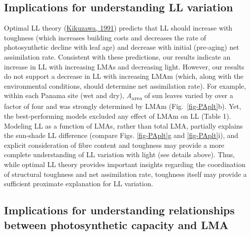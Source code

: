\documentclass[
  12pt,
  a4paper,
,tablecaptionabove
]{scrartcl}
\begin{document}
\hypertarget{implications-for-understanding-ll-variation}{%
\subsection{Implications for understanding LL
variation}\label{implications-for-understanding-ll-variation}}

Optimal LL theory (\protect\hyperlink{ref-Kikuzawa1991}{Kikuzawa, 1991})
predicts that LL should increase with toughness (which increases
building costs and decreases the rate of photosynthetic decline with
leaf age) and decrease with initial (pre-aging) net assimilation rate.
Consistent with these predictions, our results indicate an increase in
LL with increasing LMAs and decreasing light. However, our results do
not support a decrease in LL with increasing LMAm (which, along with the
environmental conditions, should determine net assimilation rate). For
example, within each Panama site (wet and dry),
\emph{A}\textsubscript{area} of sun leaves varied by over a factor of
four and was strongly determined by LMAm (Fig.~\ref{fig-PAplt}b). Yet,
the best-performing models excluded any effect of LMAm on LL (Table 1).
Modeling LL as a function of LMAs, rather than total LMA, partially
explains the sun-shade LL difference (compare Figs. \ref{fig-PAplt}g and
\ref{fig-PAplt}i), and explicit consideration of fibre content and
toughness may provide a more complete understanding of LL variation with
light (see details above). Thus, while optimal LL theory provides
important insights regarding the coordination of structural toughness
and net assimilation rate, toughness itself may provide a sufficient
proximate explanation for LL variation.

\hypertarget{implications-for-understanding-relationships-between-photosynthetic-capacity-and-lma}{%
\subsection{Implications for understanding relationships between
photosynthetic capacity and
LMA}\label{implications-for-understanding-relationships-between-photosynthetic-capacity-and-lma}}
\end{document}
